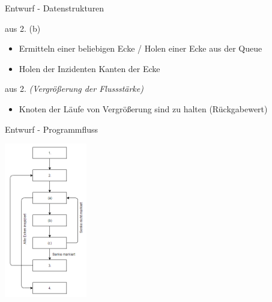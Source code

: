 \documentclass{beamer}
\begin{document}
    \begin{frame}{Entwurf - Datenstrukturen}
        \begin{block}{aus 2. (b)}
            \begin{itemize}
                \item Ermitteln einer beliebigen Ecke / Holen einer Ecke aus der Queue
                \item Holen der Inzidenten Kanten der Ecke
            \end{itemize}
        \end{block}

        \begin{block}{aus 2. \textit{(Vergr\"o\ss{}erung der Flussst\"arke)}}
            \begin{itemize}
                \item Knoten der L\"aufe von Vergr\"o\ss{}erung sind zu halten (R\"uckgabewert)
            \end{itemize}
        \end{block}
    \end{frame}

    \begin{frame}{Entwurf - Programmfluss}
        \begin{center}
            \includegraphics[width=3.6cm]{../fordfulkerson.PNG}
        \end{center}
    \end{frame}
\end{document}

